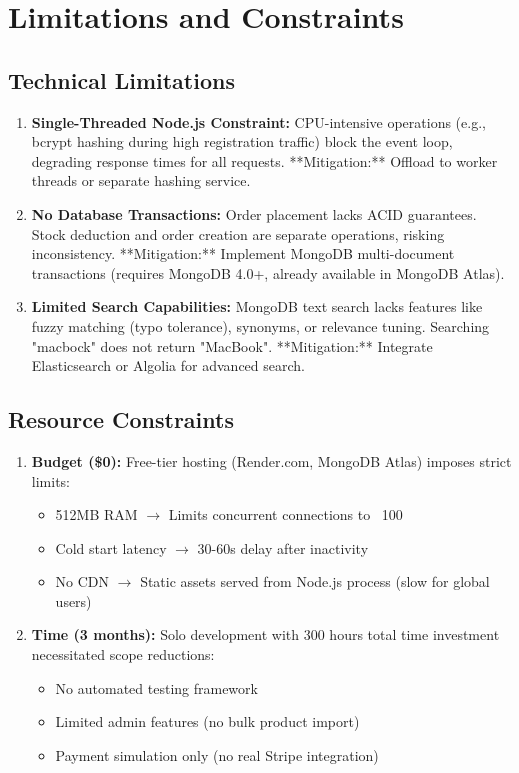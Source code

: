 \documentclass[12pt, a4paper]{report}
\begin{document}
\section{Limitations and Constraints}

\subsection{Technical Limitations}

\begin{enumerate}
    \item \textbf{Single-Threaded Node.js Constraint:} CPU-intensive operations (e.g., bcrypt hashing during high registration traffic) block the event loop, degrading response times for all requests. **Mitigation:** Offload to worker threads or separate hashing service.
    
    \item \textbf{No Database Transactions:} Order placement lacks ACID guarantees. Stock deduction and order creation are separate operations, risking inconsistency. **Mitigation:** Implement MongoDB multi-document transactions (requires MongoDB 4.0+, already available in MongoDB Atlas).
    
    \item \textbf{Limited Search Capabilities:} MongoDB text search lacks features like fuzzy matching (typo tolerance), synonyms, or relevance tuning. Searching "macbock" does not return "MacBook". **Mitigation:** Integrate Elasticsearch or Algolia for advanced search.
\end{enumerate}

\subsection{Resource Constraints}

\begin{enumerate}
    \item \textbf{Budget (\$0):} Free-tier hosting (Render.com, MongoDB Atlas) imposes strict limits:
    \begin{itemize}
        \item 512MB RAM $\rightarrow$ Limits concurrent connections to ~100
        \item Cold start latency $\rightarrow$ 30-60s delay after inactivity
        \item No CDN $\rightarrow$ Static assets served from Node.js process (slow for global users)
    \end{itemize}
    
    \item \textbf{Time (3 months):} Solo development with 300 hours total time investment necessitated scope reductions:
    \begin{itemize}
        \item No automated testing framework
        \item Limited admin features (no bulk product import)
        \item Payment simulation only (no real Stripe integration)
    \end{itemize}
\end{enumerate}
\end{document}
